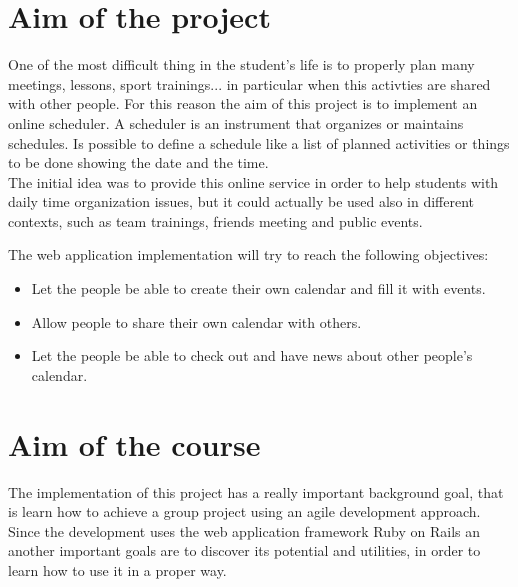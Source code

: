 
\label{Introduction}
\section{Aim of the project}
\vspace{-5mm}
One of the most difficult thing in the student's life is to properly plan many meetings, lessons, sport trainings... in particular when this activties are shared with other people.
For this reason the aim of this project is to implement an online scheduler.
A scheduler is an instrument that organizes or maintains schedules. Is possible to define a schedule like a list of planned activities or things to be done showing the date and the time.\\
The initial idea was to provide this online service in order to help students with daily time organization issues, but it could actually  be used also in different contexts, such as team trainings, friends meeting and public events.

The web application implementation will try to reach the following objectives:
\vspace{-5mm}
\begin{itemize}
 \setlength{\itemsep}{-5pt}
 \item Let the people be able to create their own calendar and fill it with events.
 \item Allow people to share their own calendar with others.
 \item Let the people be able to check out and have news about other people's calendar.
\end{itemize}
\section{Aim of the course}
\vspace{-5mm}
The implementation of this project has a really important background goal, that is learn how to achieve a group project using an agile development approach.\\
Since the development uses the web application framework Ruby on Rails an another important goals are to discover its potential and utilities, in order to learn how to use it in a proper way.